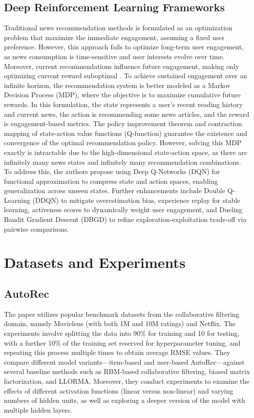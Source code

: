 \documentclass{ieeetj}
\begin{document}
\subsection{Deep Reinforcement Learning Frameworks\cite{zheng_drn_2018}}
Traditional news recommendation methods is formulated as an optimization problem that maximize the immediate engagement, assuming a fixed user preference. However, this approach fails to optimize long-term user engagement, as news consumption is time-sensitive and user interests evolve over time. Moreover, current recommendations influence future engagement, making only optimizing current reward suboptimal . To achieve sustained engagement over an infinite horizon, the recommendation system is better modeled as a Markov Decision Process (MDP), where the objective is to maximize cumulative future rewards. In this formulation, the state represents a user's recent reading history and current news, the action is recommending some news articles, and the reward is engagement-based metrics. The policy improvement theorem and contraction mapping of state-action value functions (Q-function) guarantee the existence and convergence of the optimal recommendation policy. However, solving this MDP exactly is intractable due to the high-dimensional state-action space, as there are infinitely many news states and infinitely many recommendation combinations. To address this, the authors propose using Deep Q-Networks (DQN) for functional approximation to compress state and action spaces, enabling generalization across unseen states. Further enhancements include Double Q-Learning (DDQN) to mitigate overestimation bias, experience replay for stable learning, activeness scores to dynamically weight user engagement, and Dueling Bandit Gradient Descent (DBGD) to refine exploration-exploitation trade-off via pairwise comparisons. 



\section{Datasets and Experiments}
\subsection{AutoRec\cite{sedhain2015autorec}}
The paper utilizes popular benchmark datasets from the collaborative filtering domain, namely Movielens (with both 1M and 10M ratings) and Netflix. The experiments involve splitting the data into 90\% for training and 10 for testing, with a further 10\% of the training set reserved for hyperparameter tuning, and repeating this process multiple times to obtain average RMSE values. They compare different model variants—item-based and user-based AutoRec—against several baseline methods such as RBM-based collaborative filtering, biased matrix factorization, and LLORMA. Moreover, they conduct experiments to examine the effects of different activation functions (linear versus non-linear) and varying numbers of hidden units, as well as exploring a deeper version of the model with multiple hidden layers.
\end{document}
